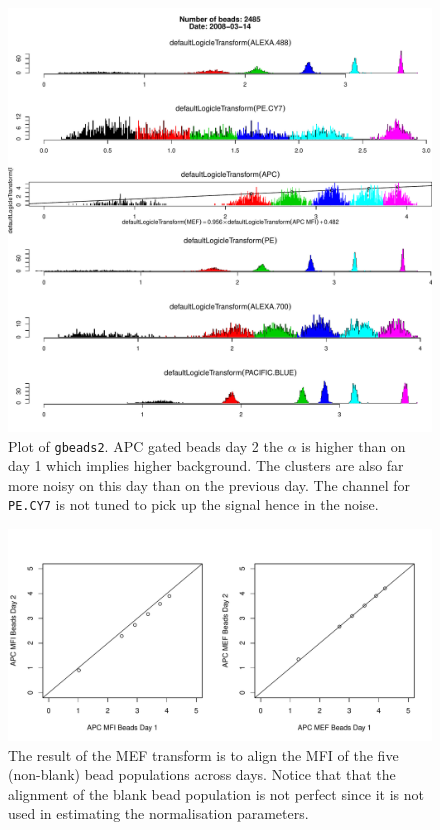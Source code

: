 \documentclass[11pt]{article}
\newcommand{\Robject}[1]{{\texttt{#1}}}
\begin{document}
%
\begin{figure}
  \centering
  \includegraphics{./gbeads2plot}
  \caption{
  \label{gbeads2plot}
  Plot of \Robject{gbeads2}.
  APC gated beads day 2 the $\alpha$ is higher than on day 1 which implies higher background.
  The clusters are also far more noisy on this day than on the previous day.
  The channel for \texttt{PE.CY7} is not tuned to pick up the signal hence in the noise.
  }
\end{figure}

%
\begin{figure}
  \centering
  \includegraphics{./plotMEFrepeatability}
  \caption{
  \label{fig:absoluteNormalisation}
  The result of the MEF transform is to align the MFI of the five (non-blank) bead populations across days.
  Notice that that the alignment of the blank bead population is not perfect since it is not used in estimating the normalisation parameters.
  }
\end{figure}
\end{document}

